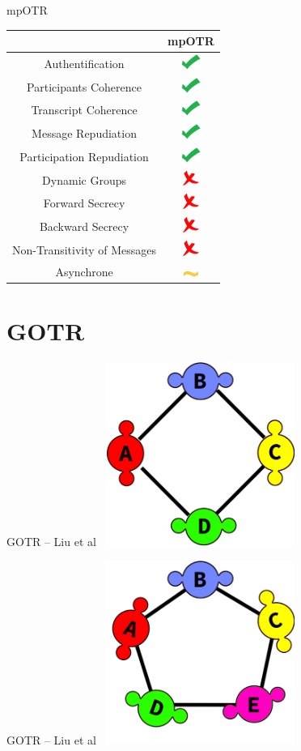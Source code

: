 \documentclass{beamer}
\newcommand{\okay}{\includegraphics[height=0.5cm]{img/check.png}}
\newcommand{\nope}{\includegraphics[height=0.5cm]{img/cross.png}}
\newcommand{\sortof}{\includegraphics[width=0.5cm]{img/tilde.png}}
\begin{document}
\begin{frame}{mpOTR}
	\center
  	\begin{tabular}{c|c}
			 & mpOTR \\
			\hline
  		Authentification & \okay \\
  		\hline
  		Participants Coherence & \okay \\
  		Transcript Coherence & \okay \\
  		\hline
  		Message Repudiation & \okay \\
  		Participation Repudiation & \okay \\
  		\hline
  		Dynamic Groups & \nope \\
  		\hline
  		Forward Secrecy & \nope \\
  		Backward Secrecy & \nope \\
  		Non-Transitivity of Messages & \nope \\
  		\hline
  		Asynchrone & \sortof 
    \end{tabular}
\end{frame}


\section{GOTR}
\begin{frame}{GOTR – Liu et al~\cite{gotr}}
	\center
	\includegraphics[height=6cm]{img/group_ring4.png}
\end{frame}

\begin{frame}{GOTR – Liu et al~\cite{gotr}}
	\center
	\includegraphics[height=6cm]{img/group_ring5.png}
\end{frame}
\end{document}
